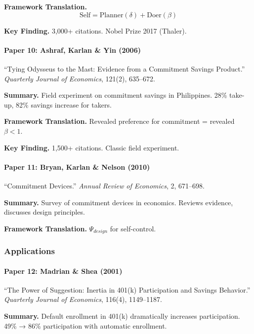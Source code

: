 \textbf{Framework Translation.}
\begin{equation}
\text{Self} = \text{Planner}(\delta) + \text{Doer}(\beta)
\end{equation}

\textbf{Key Finding.}
3,000+ citations. Nobel Prize 2017 (Thaler).

\paragraph{Paper 10: Ashraf, Karlan \& Yin (2006)}

``Tying Odysseus to the Mast: Evidence from a Commitment Savings Product.''
\textit{Quarterly Journal of Economics}, 121(2), 635--672.

\textbf{Summary.}
Field experiment on commitment savings in Philippines.
28\% take-up, 82\% savings increase for takers.

\textbf{Framework Translation.}
Revealed preference for commitment = revealed $\beta < 1$.

\textbf{Key Finding.}
1,500+ citations. Classic field experiment.

\paragraph{Paper 11: Bryan, Karlan \& Nelson (2010)}

``Commitment Devices.''
\textit{Annual Review of Economics}, 2, 671--698.

\textbf{Summary.}
Survey of commitment devices in economics. Reviews evidence, 
discusses design principles.

\textbf{Framework Translation.}
$\Psi_{design}$ for self-control.

\subsubsection{Applications}

\paragraph{Paper 12: Madrian \& Shea (2001)}

``The Power of Suggestion: Inertia in 401(k) Participation and Savings Behavior.''
\textit{Quarterly Journal of Economics}, 116(4), 1149--1187.

\textbf{Summary.}
Default enrollment in 401(k) dramatically increases participation.
49\% → 86\% participation with automatic enrollment.

